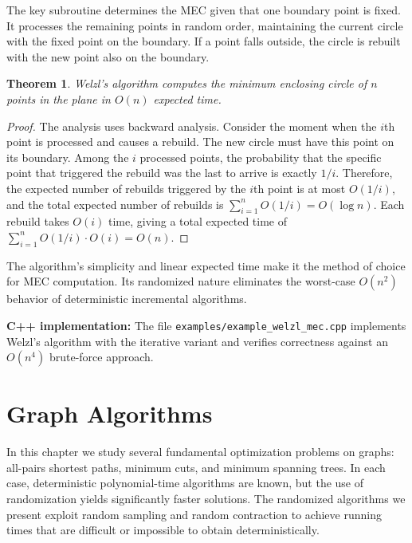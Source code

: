 \documentclass[twoside,12pt]{book}
\theoremstyle{plain}
\newtheorem{theorem}{Theorem}[chapter]
\theoremstyle{definition}
\theoremstyle{remark}
\newenvironment{cpplisting}{\begin{center}\small}{\end{center}}
\begin{document}
The key subroutine determines the MEC given that one boundary point is fixed. It processes the remaining points in random order, maintaining the current circle with the fixed point on the boundary. If a point falls outside, the circle is rebuilt with the new point also on the boundary.

\begin{theorem}\label{thm:welzl-mec}
Welzl's algorithm computes the minimum enclosing circle of $n$ points in the plane in $O(n)$ expected time.
\end{theorem}

\begin{proof}
The analysis uses backward analysis. Consider the moment when the $i$th point is processed and causes a rebuild. The new circle must have this point on its boundary. Among the $i$ processed points, the probability that the specific point that triggered the rebuild was the last to arrive is exactly $1/i$. Therefore, the expected number of rebuilds triggered by the $i$th point is at most $O(1/i)$, and the total expected number of rebuilds is $\sum_{i=1}^n O(1/i) = O(\log n)$. Each rebuild takes $O(i)$ time, giving a total expected time of $\sum_{i=1}^n O(1/i) \cdot O(i) = O(n)$.
\end{proof}

The algorithm's simplicity and linear expected time make it the method of choice for MEC computation. Its randomized nature eliminates the worst-case $O(n^2)$ behavior of deterministic incremental algorithms.

\begin{cpplisting}
\textbf{C++ implementation:} The file \texttt{examples/example\_welzl\_mec.cpp} implements Welzl's algorithm with the iterative variant and verifies correctness against an $O(n^4)$ brute-force approach.
\end{cpplisting}


\chapter{Graph Algorithms}
\label{ch:graph-algorithms}

In this chapter we study several fundamental optimization problems on graphs: all-pairs shortest paths, minimum cuts, and minimum spanning trees. In each case, deterministic polynomial-time algorithms are known, but the use of randomization yields significantly faster solutions. The randomized algorithms we present exploit random sampling and random contraction to achieve running times that are difficult or impossible to obtain deterministically.
\end{document}
